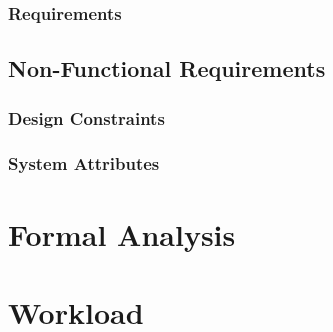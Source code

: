 \documentclass[a4paper, oneside]{book}
\begin{document}
\subsection{Requirements}
\section{Non-Functional Requirements}
\subsection{Design Constraints}
\subsection{System Attributes}

\chapter{Formal Analysis}

\chapter{Workload}


\end{document}
